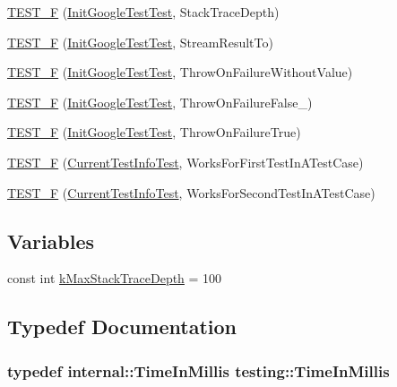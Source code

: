 \begin{DoxyCompactItemize}
\hyperlink{namespacetesting_af8579f8ad3383827814d1fbea4fdeee9}{T\-E\-S\-T\-\_\-\-F} (\hyperlink{classtesting_1_1_init_google_test_test}{Init\-Google\-Test\-Test}, Stack\-Trace\-Depth)
\item 
\hyperlink{namespacetesting_ad9cf0c452b4d2645b037725957021c6c}{T\-E\-S\-T\-\_\-\-F} (\hyperlink{classtesting_1_1_init_google_test_test}{Init\-Google\-Test\-Test}, Stream\-Result\-To)
\item 
\hyperlink{namespacetesting_a2824800277b4a1e8732abd5d7c2349d1}{T\-E\-S\-T\-\_\-\-F} (\hyperlink{classtesting_1_1_init_google_test_test}{Init\-Google\-Test\-Test}, Throw\-On\-Failure\-Without\-Value)
\item 
\hyperlink{namespacetesting_adfcdbd6b2715fddd03a47a822517ddea}{T\-E\-S\-T\-\_\-\-F} (\hyperlink{classtesting_1_1_init_google_test_test}{Init\-Google\-Test\-Test}, Throw\-On\-Failure\-False\-\_)
\item 
\hyperlink{namespacetesting_ad7513c23ff21a4d2761cadfd2afe87e1}{T\-E\-S\-T\-\_\-\-F} (\hyperlink{classtesting_1_1_init_google_test_test}{Init\-Google\-Test\-Test}, Throw\-On\-Failure\-True)
\item 
\hyperlink{namespacetesting_a1e55a3ca18d877e1e83ce0ed9e7b5c79}{T\-E\-S\-T\-\_\-\-F} (\hyperlink{classtesting_1_1_current_test_info_test}{Current\-Test\-Info\-Test}, Works\-For\-First\-Test\-In\-A\-Test\-Case)
\item 
\hyperlink{namespacetesting_a3775bdbb5d24619425c52103e7ae6434}{T\-E\-S\-T\-\_\-\-F} (\hyperlink{classtesting_1_1_current_test_info_test}{Current\-Test\-Info\-Test}, Works\-For\-Second\-Test\-In\-A\-Test\-Case)
\end{DoxyCompactItemize}
\subsection*{Variables}
\begin{DoxyCompactItemize}
\item 
const int \hyperlink{namespacetesting_ae605f2ccac04616bb7812ca72e517082}{k\-Max\-Stack\-Trace\-Depth} = 100
\end{DoxyCompactItemize}


\subsection{Typedef Documentation}
\hypertarget{namespacetesting_a992de1d091ce660f451d1e8b3ce30fd6}{
\subsubsection[{Time\-In\-Millis}]{\setlength{\rightskip}{0pt plus 5cm}typedef {\bf internal\-::\-Time\-In\-Millis} {\bf testing\-::\-Time\-In\-Millis}}}\label{namespacetesting_a992de1d091ce660f451d1e8b3ce30fd6}



